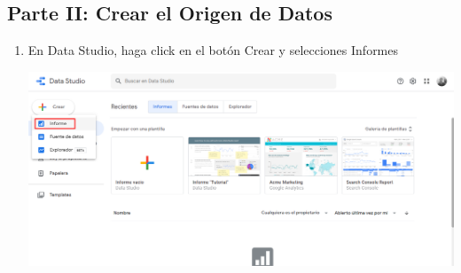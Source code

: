 \documentclass{article}
\begin{document}
    \subsection{Parte II: Crear el Origen de Datos}
    \begin{enumerate}[\tab 1.]
        \item En Data Studio, haga click en el botón Crear y selecciones Informes
        \begin{center}
            \includegraphics[width=13cm]{./images/5.png}
        \end{center}
        

\end{enumerate}
\end{document}
